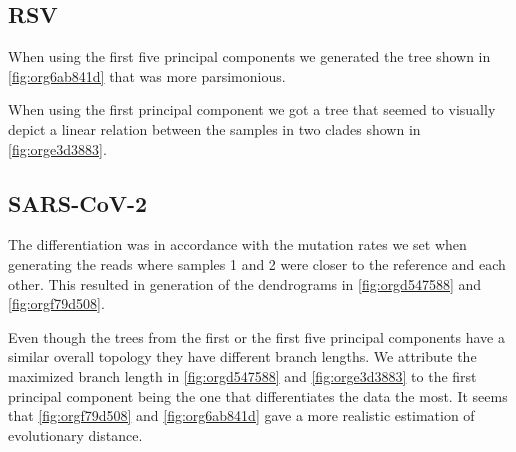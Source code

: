 \documentclass[10pt, a4paper]{article}
\begin{document}
\subsection{RSV}
\label{sec:org89c2962}
When using the first five principal components we generated the tree shown in 
\ref{fig:org6ab841d} that was more parsimonious.

When using the first principal component we got a tree that seemed to visually
depict a linear relation between the samples in two clades shown in
\ref{fig:orge3d3883}.

\subsection{SARS-CoV-2}
\label{sec:org078bb30}
The differentiation was in accordance with the mutation rates we set when 
generating the reads where samples 1 and 2 were closer to the reference and each
other. 
This resulted in generation of the dendrograms in \ref{fig:orgd547588} and
\ref{fig:orgf79d508}.

Even though the trees from the first or the first five principal components 
have a similar overall topology they have different branch lengths. 
We attribute the maximized branch length in \ref{fig:orgd547588} and 
\ref{fig:orge3d3883} to the
first principal component being the one that differentiates the data the most.
It seems that \ref{fig:orgf79d508} and \ref{fig:org6ab841d} gave a more realistic
estimation of evolutionary distance.
\end{document}
